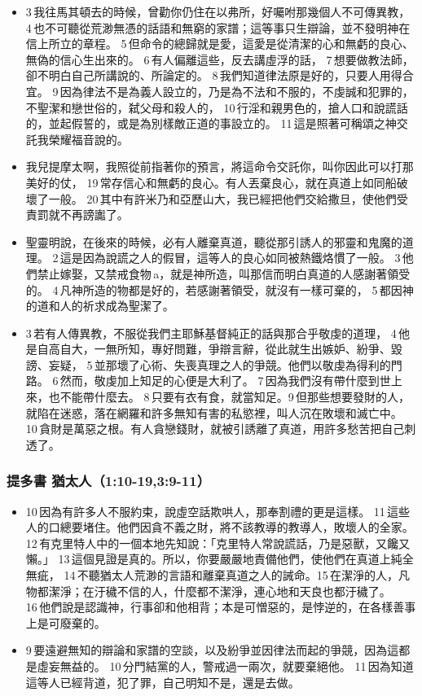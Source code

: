   \begin{itemize}
 \itemsep-.25em
\item 3 我往馬其頓去的時候，曾勸你仍住在以弗所，好囑咐那幾個人不可傳異教， 4 也不可聽從荒渺無憑的話語和無窮的家譜；這等事只生辯論，並不發明神在信上所立的章程。 5 但命令的總歸就是愛，這愛是從清潔的心和無虧的良心、無偽的信心生出來的。 6 有人偏離這些，反去講虛浮的話， 7 想要做教法師，卻不明白自己所講說的、所論定的。 8 我們知道律法原是好的，只要人用得合宜。 9 因為律法不是為義人設立的，乃是為不法和不服的，不虔誠和犯罪的，不聖潔和戀世俗的，弑父母和殺人的， 10 行淫和親男色的，搶人口和說謊話的，並起假誓的，或是為別樣敵正道的事設立的。 11 這是照著可稱頌之神交託我榮耀福音說的。
 \item  我兒提摩太啊，我照從前指著你的預言，將這命令交託你，叫你因此可以打那美好的仗， 19 常存信心和無虧的良心。有人丟棄良心，就在真道上如同船破壞了一般。 20 其中有許米乃和亞歷山大，我已經把他們交給撒旦，使他們受責罰就不再謗讟了。
  \item 聖靈明說，在後來的時候，必有人離棄真道，聽從那引誘人的邪靈和鬼魔的道理。 2 這是因為說謊之人的假冒，這等人的良心如同被熱鐵烙慣了一般。 3 他們禁止嫁娶，又禁戒食物 a，就是神所造，叫那信而明白真道的人感謝著領受的。 4 凡神所造的物都是好的，若感謝著領受，就沒有一樣可棄的， 5 都因神的道和人的祈求成為聖潔了。
 \item  3 若有人傳異教，不服從我們主耶穌基督純正的話與那合乎敬虔的道理， 4 他是自高自大，一無所知，專好問難，爭辯言辭，從此就生出嫉妒、紛爭、毀謗、妄疑， 5 並那壞了心術、失喪真理之人的爭競。他們以敬虔為得利的門路。 6 然而，敬虔加上知足的心便是大利了。 7 因為我們沒有帶什麼到世上來，也不能帶什麼去。 8 只要有衣有食，就當知足。9 但那些想要發財的人，就陷在迷惑，落在網羅和許多無知有害的私慾裡，叫人沉在敗壞和滅亡中。 10 貪財是萬惡之根。有人貪戀錢財，就被引誘離了真道，用許多愁苦把自己刺透了。
 \end{itemize}
    
\subsubsection{提多書  猶太人（1:10-19,3:9-11） } 
  \begin{itemize}
 \itemsep-.25em
\item  10 因為有許多人不服約束，說虛空話欺哄人，那奉割禮的更是這樣。 11 這些人的口總要堵住。他們因貪不義之財，將不該教導的教導人，敗壞人的全家。 12 有克里特人中的一個本地先知說：「克里特人常說謊話，乃是惡獸，又饞又懶。」 13 這個見證是真的。所以，你要嚴嚴地責備他們，使他們在真道上純全無疵， 14 不聽猶太人荒渺的言語和離棄真道之人的誡命。15 在潔淨的人，凡物都潔淨；在汙穢不信的人，什麼都不潔淨，連心地和天良也都汙穢了。 16 他們說是認識神，行事卻和他相背；本是可憎惡的，是悖逆的，在各樣善事上是可廢棄的。
 \item  9 要遠避無知的辯論和家譜的空談，以及紛爭並因律法而起的爭競，因為這都是虛妄無益的。 10 分門結黨的人，警戒過一兩次，就要棄絕他。 11 因為知道這等人已經背道，犯了罪，自己明知不是，還是去做。
 \end{itemize}  
    

